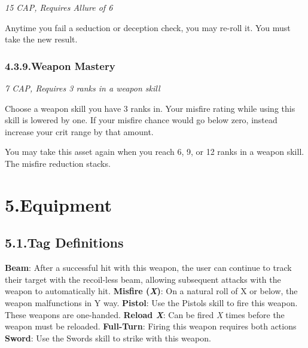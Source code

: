 \documentclass{article}
\begin{document}
\noindent{}\emph{15 CAP, Requires Allure of 6}%

Anytime you fail a seduction or deception check, you may re-roll it. You must take the new result.%

\subsubsection{4.3.9.\hspace*{0.5em}Weapon Mastery}\label{sec-weapon-mastery}%

\noindent{}\emph{7 CAP, Requires 3 ranks in a weapon skill}%

Choose a weapon skill you have 3 ranks in. Your misfire rating while using this skill is lowered by one. If your misfire chance would go below zero, instead increase your crit range by that amount.%

You may take this asset again when you reach 6, 9, or 12 ranks in a weapon skill. The misfire reduction stacks.%

\mdhr{}%

\section{5.\hspace*{0.5em}Equipment}\label{sec-equipment}%

\subsection{5.1.\hspace*{0.5em}Tag Definitions}\label{sec-tag-definitions}%

\noindent{}\textbf{Beam}: After a successful hit with this weapon, the user can continue to track their target with the recoil-less beam, allowing subsequent attacks with the weapon to automatically hit.\mdbr
{}\textbf{Misfire (\emph{X})}: On a natural roll of X or below, the weapon malfunctions in Y way. \mdbr
{}\textbf{Pistol}: Use the Pistols skill to fire this weapon. These weapons are one-handed.\mdbr
{}\textbf{Reload \emph{X}}: Can be fired \emph{X} times before the weapon must be reloaded.\mdbr
{}\textbf{Full-Turn}: Firing this weapon requires both actions\mdbr
{}\textbf{Sword}: Use the Swords skill to strike with this weapon. %
\end{document}
